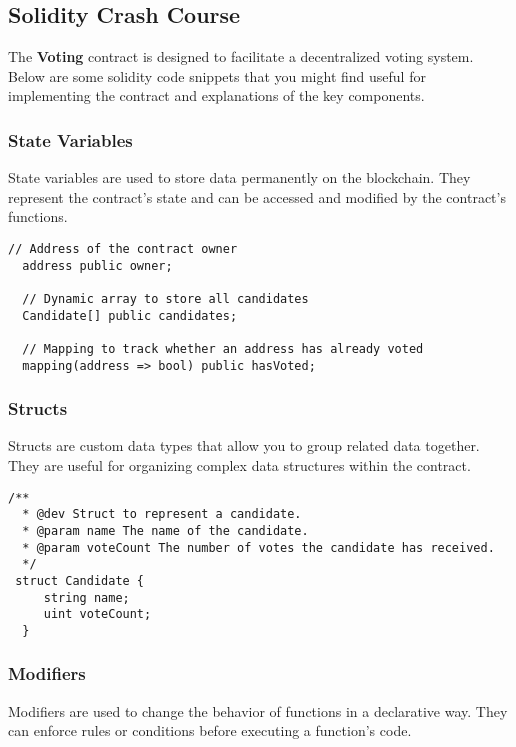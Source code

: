 \documentclass[12pt]{article}
\begin{document}
\subsection{Solidity Crash Course}

The \textbf{Voting} contract is designed to facilitate a decentralized voting system. Below are some solidity code snippets that you might find useful for implementing the contract and explanations of the key components.

\subsubsection*{State Variables}

State variables are used to store data permanently on the blockchain. They represent the contract's state and can be accessed and modified by the contract's functions.

\begin{lstlisting}[language=Solidity]
  // Address of the contract owner
  address public owner;

  // Dynamic array to store all candidates
  Candidate[] public candidates;

  // Mapping to track whether an address has already voted
  mapping(address => bool) public hasVoted;
\end{lstlisting}

\subsubsection*{Structs}

Structs are custom data types that allow you to group related data together. They are useful for organizing complex data structures within the contract.

\begin{lstlisting}[language=Solidity]
  /**
  * @dev Struct to represent a candidate.
  * @param name The name of the candidate.
  * @param voteCount The number of votes the candidate has received.
  */
 struct Candidate {
     string name;
     uint voteCount;
  }
\end{lstlisting}

\subsubsection*{Modifiers}

Modifiers are used to change the behavior of functions in a declarative way. They can enforce rules or conditions before executing a function's code.
\end{document}
